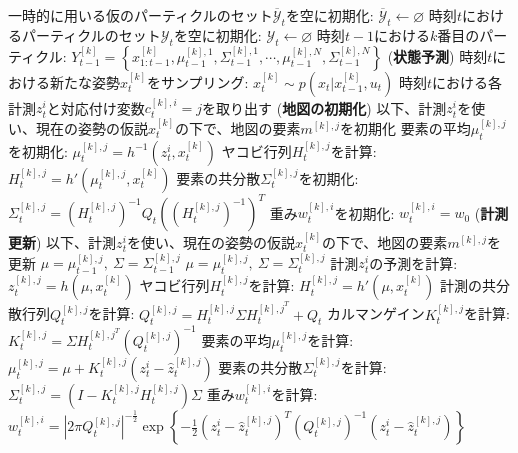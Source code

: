 \documentclass[dvipdfmx,a4paper]{jsarticle}
\begin{document}
\begin{algorithm}[H]
\begin{algorithmic}[1]
		\State 一時的に用いる仮のパーティクルのセット$\overline{\mathcal{Y}}_t$を空に初期化: $\overline{\mathcal{Y}}_t \leftarrow \varnothing$
		\State 時刻$t$におけるパーティクルのセット$\mathcal{Y}_t$を空に初期化: $\mathcal{Y}_t \leftarrow \varnothing$
		 
			\State 時刻$t - 1$における$k$番目のパーティクル: $Y_{t - 1}^{[k]} = \left\{ x_{1 : t - 1}^{[k]}, \mu_{t - 1}^{[k], 1}, \Sigma_{t - 1}^{[k], 1}, \cdots, \mu_{t - 1}^{[k], N}, \Sigma_{t - 1}^{[k], N} \right\}$
			\State (\textbf{状態予測}) 時刻$t$における新たな姿勢$x_t^{[k]}$をサンプリング: $x_t^{[k]} \sim p(x_t | x_{t - 1}^{[k]}, u_t)$
			 
				\State 時刻$t$における各計測$z_t^i$と対応付け変数$c_t^{[k], i} = j$を取り出す
					\State (\textbf{地図の初期化}) 以下、計測$z_t^i$を使い、現在の姿勢の仮説$x_t^{[k]}$の下で、地図の要素$m^{[k], j}$を初期化
					\State 要素の平均$\mu_t^{[k], j}$を初期化: $\mu_t^{[k], j} = h^{-1}(z_t^i, x_t^{[k]})$
					\State ヤコビ行列$H_t^{[k], j}$を計算: $H_t^{[k], j} = h'(\mu_t^{[k], j}, x_t^{[k]})$
					\State 要素の共分散$\Sigma_t^{[k], j}$を初期化: $\Sigma_t^{[k], j} = \left( H_t^{[k], j} \right)^{-1} Q_t \left( \left( H_t^{[k], j} \right)^{-1} \right)^T$
					\State 重み$w_t^{[k], i}$を初期化: $w_t^{[k], i} = w_0$
				\Else
					\State (\textbf{計測更新}) 以下、計測$z_t^i$を使い、現在の姿勢の仮説$x_t^{[k]}$の下で、地図の要素$m^{[k], j}$を更新
						\State $\mu = \mu_{t - 1}^{[k], j}, \ \Sigma = \Sigma_{t - 1}^{[k], j}$ 
					\Else
						\State $\mu = \mu_t^{[k], j}, \ \Sigma = \Sigma_t^{[k], j}$ 
					\EndIf
					\State 計測$z_t^i$の予測を計算: $z_t^{[k], j} = h(\mu, x_t^{[k]})$
					\State ヤコビ行列$H_t^{[k], j}$を計算: $H_t^{[k], j} = h'(\mu, x_t^{[k]})$
					\State 計測の共分散行列$Q_t^{[k], j}$を計算: $Q_t^{[k], j} = H_t^{[k], j} \Sigma H_t^{{[k], j}^T} + Q_t$
					\State カルマンゲイン$K_t^{[k], j}$を計算: $K_t^{[k], j} = \Sigma H_t^{{[k], j}^T} \left( Q_t^{[k], j} \right)^{-1}$
					\State 要素の平均$\mu_t^{[k], j}$を計算: $\mu_t^{[k], j} = \mu + K_t^{[k], j} \left( z_t^i - \widehat{z}_t^{[k], j} \right)$
					\State 要素の共分散$\Sigma_t^{[k], j}$を計算: $\Sigma_t^{[k], j} = \left( I - K_t^{[k], j} H_t^{[k], j} \right) \Sigma$
					\State 重み$w_t^{[k], i}$を計算: $w_t^{[k], i} = |2 \pi Q_t^{[k], j}|^{-\frac{1}{2}} \exp \left\{ -\frac{1}{2} \left( z_t^i - \widehat{z}_t^{[k], j} \right)^T \left( Q_t^{[k], j} \right)^{-1} \left( z_t^i - \widehat{z}_t^{[k], j} \right) \right\}$
				\EndIf
			\EndFor
	\end{algorithmic}
\end{algorithm}
\end{document}
